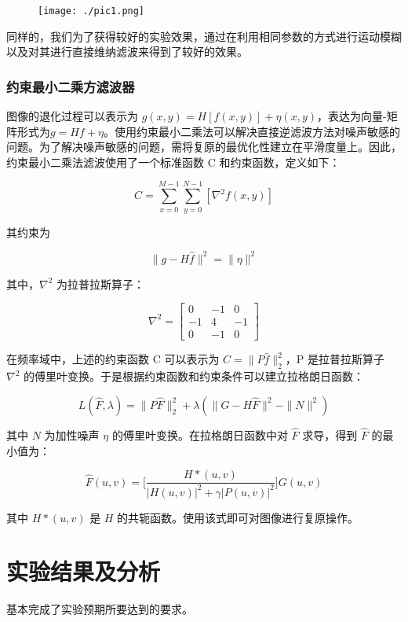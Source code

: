 \documentclass[11pt]{ctexart}
\begin{document}
    \begin{figure}[htbp]
        \centering
        \texttt{[image: ./pic1.png]}
  \end{figure}
  
同样的，我们为了获得较好的实验效果，通过在利用相同参数的方式进行运动模糊以及对其进行直接维纳滤波来得到了较好的效果。

\subsubsection{约束最小二乘方滤波器}

图像的退化过程可以表示为 $g(x,y)=H[f(x,y)]+\eta(x,y)$，表达为向量-矩阵形式为$g=Hf+\eta$。使用约束最小二乘法可以解决直接逆滤波方法对噪声敏感的问题。为了解决噪声敏感的问题，需将复原的最优化性建立在平滑度量上。因此，约束最小二乘法滤波使用了一个标准函数 C 和约束函数，定义如下：

$$
C = \sum_{x=0}^{M-1}\sum_{y=0}^{N-1}[\nabla^2f(x,y)]
$$

其约束为

$$
\parallel g-H\hat{f}\parallel^2 = \parallel \eta \parallel ^2
$$

其中，$\nabla^2$ 为拉普拉斯算子：

$$
\nabla^2 = 
\begin{bmatrix}
0 & -1 & 0 \\
-1 & 4 & -1 \\
0 & -1 & 0
\end{bmatrix}
$$

在频率域中，上述的约束函数 C 可以表示为 $C = \parallel P \hat{f} \parallel_2^2$，P 是拉普拉斯算子 $\nabla^2$ 的傅里叶变换。于是根据约束函数和约束条件可以建立拉格朗日函数：

$$
L(\hat{F}, \lambda) = \parallel P\hat{F} \parallel_2^2 + \lambda( 
\parallel G-H\hat{F}\parallel^2 - \parallel N \parallel ^2
)
$$

其中 $N$ 为加性噪声 $\eta$ 的傅里叶变换。在拉格朗日函数中对 $\hat{F}$ 求导，得到 $\hat{F}$ 的最小值为：

$$
\hat{F} (u,v) = \Big[\frac{H*(u,v)}{|H(u,v)| ^ 2 + \gamma|P(u,v)|^2}\Big] G(u,v)
$$

其中 $H*(u, v)$ 是 $H$ 的共轭函数。使用该式即可对图像进行复原操作。

\section{实验结果及分析}

基本完成了实验预期所要达到的要求。
\end{document}
